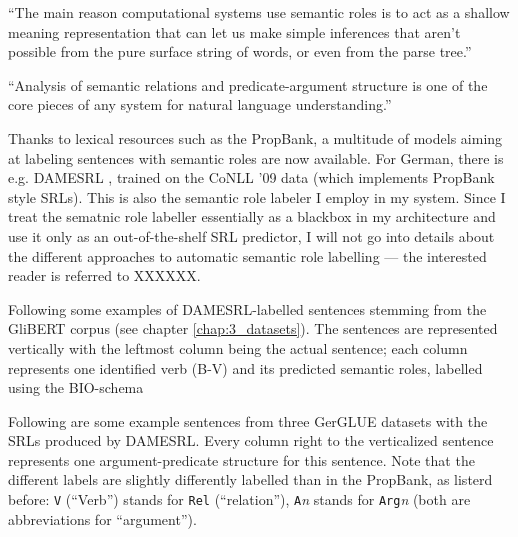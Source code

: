 {\color{red} ``The main reason computational systems use semantic roles is to act as a shallow meaning
representation that can let us make simple inferences that aren’t possible from the pure surface
string of words, or even from the parse tree.'' \cite[p.~375]{jurafsky2019speech}


``Analysis of semantic relations and predicate-argument structure is one of the core pieces of any
system for natural language understanding.'' \citep{palmer2010semantic}}

Thanks to lexical resources such as the PropBank, a multitude of models aiming at
labeling sentences with semantic roles are now available. For German, there is e.g.
DAMESRL \citep{do2018flexible}, trained on the CoNLL '09 \citep{hajivc2009conll}
data (which implements PropBank style SRLs). This is also the semantic role labeler
I employ in my system. Since I treat the sematnic role labeller essentially as a blackbox
in my architecture and use it only as an out-of-the-shelf SRL predictor, I will not
go into details about the different approaches to automatic semantic role labelling --- the
interested reader is referred to XXXXXX.

Following some examples of DAMESRL-labelled sentences stemming from the GliBERT corpus (see chapter
\ref{chap:3_datasets}). The sentences are represented vertically with the leftmost column being the
actual sentence; each column represents one identified verb (B-V) and its predicted semantic roles,
labelled using the BIO-schema

Following are some example sentences from three GerGLUE datasets with the SRLs
produced by DAMESRL. Every column right to the verticalized sentence represents one
argument-predicate structure for this sentence. Note that the different labels are
slightly differently labelled than in the PropBank, as listerd before: \texttt{V}
(``Verb'') stands for \texttt{Rel} (``relation''), \texttt{A}\textit{n} stands for
\texttt{Arg}\textit{n} (both are abbreviations for ``argument'').

